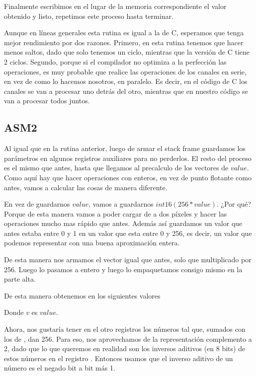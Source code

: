 Finalmente escribimos en el lugar de la memoria correspondiente el valor obtenido y listo, repetimos este proceso hasta terminar.

Aunque en líneas generales esta rutina es igual a la de C, esperamos que tenga mejor rendimiento por dos razones.
Primero, en esta rutina tenemos que hacer menos saltos, dado que solo tenemos un ciclo, mientras que la versión de C tiene 2 ciclos.
Segundo, porque si el compilador no optimiza a la perfección las operaciones, es muy probable que realice las operaciones de los canales en serie, en vez de como lo hacemos nosotros, en paralelo.
Es decir, en el código de C los canales se van a procesar uno detrás del otro, mientras que en nuestro código se van a procesar todos juntos.


\subsection{ASM2}

Al igual que en la rutina anterior, luego de armar el stack frame guardamos los parámetros en algunos registros auxiliares para no perderlos. El resto del proceso es el mismo que antes, hasta que llegamos al precalculo de los vectores de $value$. Como aquí hay que hacer operaciones con enteros, en vez de punto flotante como antes, vamos a calcular las cosas de manera diferente.

En vez de guardarnos $value$, vamos a guardarnos $int16(256*value)$. ¿Por qué? Porque de esta manera vamos a poder cargar de a dos píxeles y hacer las operaciones mucho mas rápido que antes. Además así guardamos un valor que antes estaba entre 0 y 1 en un valor que esta entre 0 y 256, es decir, un valor que podemos representar con una buena aproximación entera.

De esta manera nos armamos el vector igual que antes, solo que multiplicado por 256. Luego lo pasamos a entero y luego lo empaquetamos consigo mismo en la parte alta.

De esta manera obtenemos en  los siguientes valores


Donde $v$ es $value$.


Ahora, nos gustaría tener en el otro registros los números tal que, sumados con los de , dan 256. Para eso, nos aprovechamos de la representación complemento a 2, dado que lo que queremos en realidad son los inversos aditivos (en 8 bits) de estos números en el registro . Entonces usamos que el inverso aditivo de un número es el negado bit a bit más 1.


